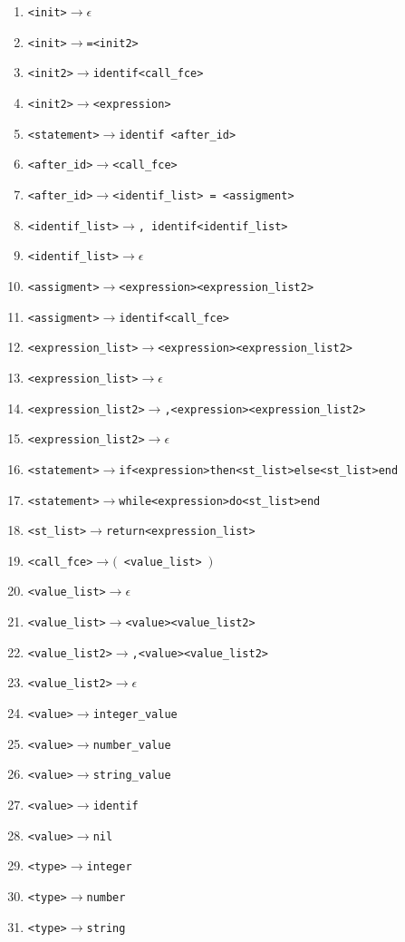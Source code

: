\documentclass[11pt]{article}
\newcommand{\term}[1]{{\color{red}#1}}
\newcommand{\arrow}{$\rightarrow$}
\begin{document}
\begin{enumerate}
    \item \texttt{<init>\arrow{}$\epsilon$}
    \item \texttt{<init>\arrow{}\term{=}<init2>}
    \item \texttt{<init2>\arrow{}\term{identif}<call\_fce>}
    \item \texttt{<init2>\arrow{}<expression>}
    \item \texttt{<statement>\arrow \term{identif} <after\_id>}    %
    \item \texttt{<after\_id>\arrow{}<call\_fce>}
    \item \texttt{<after\_id>\arrow{}<identif\_list> \term{=} <assigment>}  
    \item \texttt{<identif\_list>\arrow{}\term{,} \term{identif}<identif\_list>}
    \item \texttt{<identif\_list>\arrow{}$\epsilon$}
    \item \texttt{<assigment>\arrow{}<expression><expression\_list2>}
    \item \texttt{<assigment>\arrow{}\term{identif}<call\_fce>} 
    \item \texttt{<expression\_list>\arrow{}<expression><expression\_list2>}
    \item \texttt{<expression\_list>\arrow{}$\epsilon$}
    \item \texttt{<expression\_list2>\arrow{}\term{,}<expression><expression\_list2>}
    \item \texttt{<expression\_list2>\arrow{}$\epsilon$}
    \item \texttt{<statement>\arrow{}\term{if}<expression>\term{then}<st\_list>\term{else}<st\_list>\term{end}}
    \item \texttt{<statement>\arrow{}\term{while}<expression>\term{do}<st\_list>\term{end}}     
    \item \texttt{<st\_list>\arrow{}\term{return}<expression\_list>}
    \item \texttt{<call\_fce>\arrow{}\term{$($} <value\_list> \term{$)$}}
    \item \texttt{<value\_list>\arrow{}$\epsilon$}
    \item \texttt{<value\_list>\arrow{}<value><value\_list2>}
    \item \texttt{<value\_list2>\arrow{}\term{,}<value><value\_list2>}
    \item \texttt{<value\_list2>\arrow{}$\epsilon$}
    \item \texttt{<value>\arrow{\term{integer\_value}}}
    \item \texttt{<value>\arrow{\term{number\_value}}}
    \item \texttt{<value>\arrow{\term{string\_value}}}
    \item \texttt{<value>\arrow{\term{identif}}}
    \item \texttt{<value>\arrow{\term{nil}}}
    \item \texttt{<type>\arrow{}\term{integer}}
    \item \texttt{<type>\arrow{}\term{number}}
    \item \texttt{<type>\arrow{}\term{string}}
\end{enumerate}
\end{document}

